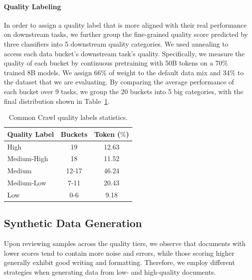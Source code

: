 \documentclass[11pt]{article}
\begin{document}
\paragraph{Quality Labeling}
In order to assign a quality label that is more aligned with their real performance on downstream tasks, we further group the fine-grained quality score predicted by three classifiers into 5 downstream quality categories. We used annealing to access each data bucket's downstream task's quality. Specifically, we measure the quality of each bucket by continuous pretraining with 50B tokens on a 70\% trained 8B models. We assign 66\% of weight to the default data mix and 34\% to the dataset that we are evaluating. By comparing the average performance of each bucket over 9 tasks, we group the 20 buckets into 5 big categories, with the final distribution shown in Table~\ref{table:quality_label_stats}.

\begin{table}[htbp]\centering\small
\begin{tabularx}{\linewidth}{Xcc}
\toprule
\textbf{Quality Label} & \multicolumn{1}{l}{\textbf{Buckets}} & \multicolumn{1}{l}{\textbf{Token ($\%$)}}  \\ \midrule
High                   & 19                                    & 12.63                                       \\
Medium-High            & 18                                    & 11.52                                       \\
Medium                 & 12-17                                 & 46.24                                       \\
Medium-Low             & 7-11                                  & 20.43                                       \\
Low                    & 0-6                                   & 9.18                                        \\ \bottomrule
\end{tabularx}
\caption{Common Crawl quality labels statistics.}
\label{table:quality_label_stats}
\end{table}

\subsection{Synthetic Data Generation} \label{sec:synthetic}

Upon reviewing samples across the quality tiers, we observe that documents with lower scores tend to contain more noise and errors, while those scoring higher generally exhibit good writing and formatting.
Therefore, we employ different strategies when generating data from low- and high-quality documents.
\end{document}
